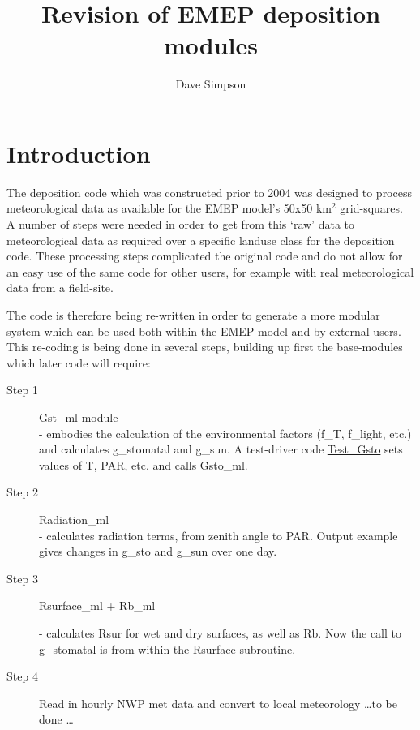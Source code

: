 \documentclass[12pt]{article}
\begin{document}
\title{Revision of EMEP deposition modules}
\author{Dave Simpson}
\maketitle



\section{Introduction}

The deposition code which was constructed prior to 2004 was designed to process
meteorological data as available for the EMEP model's
50x50 km$^2$ grid-squares. A number of steps were needed in order to
get from this `raw' data to meteorological data as required over a
specific landuse class for the deposition code. These processing steps
complicated the original code and do not allow for an easy use of
the same code for other users, for example with real meteorological
data from a field-site.

The code is therefore being re-written in order to generate a more
modular system which can be used both within the EMEP model and 
by external users.
This re-coding is being done in several steps, building up first the
base-modules which later code will require: 


\begin{description}
\item[Step 1] Gst\_ml module\\

- embodies the calculation of the
environmental factors (f\_T, f\_light, etc.) and calculates  g\_stomatal
and g\_sun. A test-driver code \url{Test_Gsto} sets values of T, PAR, etc.
and calls Gsto\_ml.

\item[Step 2]  Radiation\_ml\\

- calculates radiation terms, from zenith angle to PAR. Output example gives
changes in g\_sto and g\_sun over one day.

\item[Step 3]  Rsurface\_ml + Rb\_ml

- calculates Rsur for wet and dry surfaces, as well as Rb. Now the call to g\_stomatal is
from within the Rsurface subroutine.

\item[Step 4]  Read in hourly NWP met data and convert to local meteorology
\dots to be done \dots
\end{description}
\end{document}
